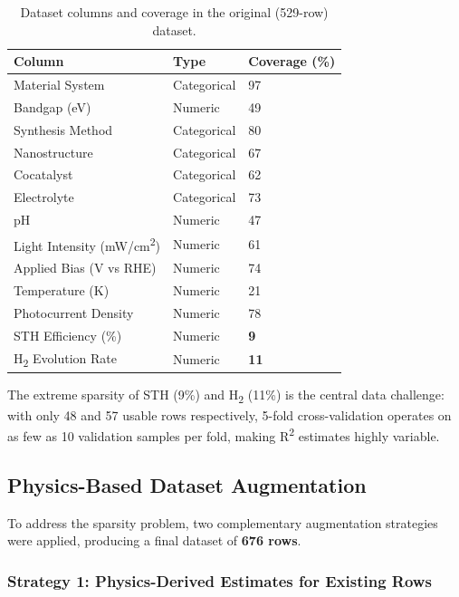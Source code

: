 \begin{table}[h]
\centering
\caption{Dataset columns and coverage in the original (529-row) dataset.}
\label{tab:columns}
\begin{tabular}{lll}
\toprule
Column & Type & Coverage (\%) \\
\midrule
Material System         & Categorical & 97 \\
Bandgap (eV)            & Numeric     & 49 \\
Synthesis Method        & Categorical & 80 \\
Nanostructure           & Categorical & 67 \\
Cocatalyst              & Categorical & 62 \\
Electrolyte             & Categorical & 73 \\
pH                      & Numeric     & 47 \\
Light Intensity (mW/cm\textsuperscript{2}) & Numeric & 61 \\
Applied Bias (V vs RHE) & Numeric     & 74 \\
Temperature (K)         & Numeric     & 21 \\
Photocurrent Density    & Numeric     & 78 \\
STH Efficiency (\%)     & Numeric     & \textbf{9} \\
H\textsubscript{2} Evolution Rate & Numeric & \textbf{11} \\
\bottomrule
\end{tabular}
\end{table}

The extreme sparsity of STH (9\%) and H\textsubscript{2} (11\%) is the
central data challenge: with only 48 and 57 usable rows respectively,
5-fold cross-validation operates on as few as 10 validation samples per fold,
making R\textsuperscript{2} estimates highly variable.

\subsection{Physics-Based Dataset Augmentation}

To address the sparsity problem, two complementary augmentation strategies
were applied, producing a final dataset of \textbf{676 rows}.

\subsubsection{Strategy 1: Physics-Derived Estimates for Existing Rows}

